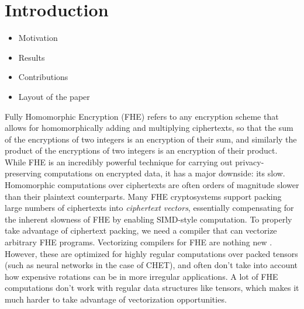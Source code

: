 \section{Introduction}\label{sec:intro}
\begin{itemize}
    \item Motivation
    \item Results
    \item Contributions
    \item Layout of the paper
\end{itemize}

Fully Homomorphic Encryption (FHE) refers to any encryption scheme that allows for homomorphically adding and multiplying ciphertexts, so that the sum of the encryptions of two integers is an encryption of their sum, and similarly the product of the encryptions of two integers is an encryption of their product.
While FHE is an incredibly powerful technique for carrying out privacy-preserving computations on encrypted data, it has a major downside: its slow.
Homomorphic computations over ciphertexts are often orders of magnitude slower than their plaintext counterparts.
Many FHE cryptosystems support packing large numbers of ciphertexts into {\em ciphertext vectors}, essentially compensating for the inherent slowness of FHE by enabling SIMD-style computation.
To properly take advantage of ciphertext packing, we need a compiler that can vectorize arbitrary FHE programs.
Vectorizing compilers for FHE are nothing new \cite{CHET, Porcupine}.
However, these are optimized for highly regular computations over packed tensors (such as neural networks in the case of CHET), and often don't take into account how expensive rotations can be in more irregular applications.
A lot of FHE computations don't work with regular data structures like tensors, which makes it much harder to take advantage of vectorization opportunities.

